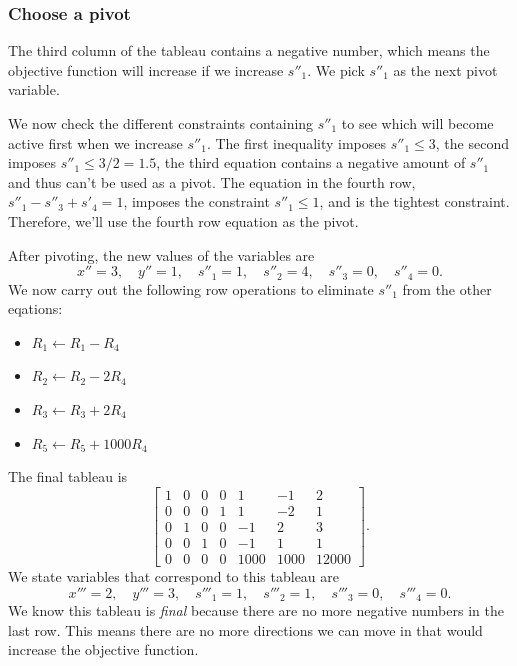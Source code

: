 \documentclass[11pt,oneside]{article}
\begin{document}
		

	\subsubsection{Choose a pivot}
	
		The third column of the tableau contains a negative number,
		which means the objective function will increase if we increase $s''_1$.
		We pick $s''_1$ as the next pivot variable.
		
		We now check the different constraints containing $s''_1$ to see which will become
		active first when we increase $s''_1$.
		The first inequality imposes $s''_1 \leq 3$,
		the second imposes $s''_1 \leq 3/2=1.5$,
		the third equation contains a negative amount of $s''_1$ and thus can't be used as a pivot.
		The equation in the fourth row, $s''_1 -s''_3 + s'_4 = 1$,
		imposes the constraint $s''_1 \leq 1$,
		and is the tightest constraint.
		Therefore, we'll use the fourth row equation as the pivot.
		
		After pivoting, the new values of the variables are
		\[
			x''=3, \quad y''=1, \quad s''_1=1, \quad s''_2=4,  \quad s''_3=0, \quad s''_4=0.
		\]
		We now carry out the following row operations to eliminate $s''_1$ from the other eqations:
		\begin{itemize}
			\item $R_1 \gets R_1 - R_4$
			\item $R_2 \gets R_2 - 2R_4$
			\item $R_3 \gets R_3 + 2R_4$
			\item $R_5 \gets R_5 + 1000R_4$
		\end{itemize}				

		\noindent
		The final tableau is
		\[
		\left[
		\begin{array}{rrrrrr|r}
		1& 0& 0& 0&    1&   -1&     2      \\ 
		0& 0& 0& 1&    1&   -2&     1      \\ 
		0& 1& 0& 0&   -1&    2&     3      \\ 
		0& 0& 1& 0&   -1&    1&     1      \\ 
		0& 0& 0& 0& 1000& 1000& 12000      
		\end{array}
		\right].
		\]
		We state variables that correspond to this tableau are
		\[
			x'''=2, \quad y'''=3, \quad s'''_1=1, \quad s'''_2=1,  \quad s'''_3=0, \quad s'''_4=0.
		\]	
		We know this tableau is \emph{final} because there are no more negative numbers in the last row.
		This means there are no more directions we can move in that would increase the objective function.
\end{document}
